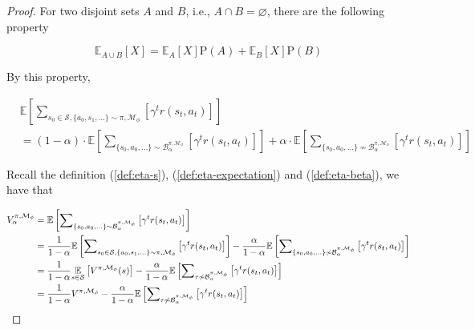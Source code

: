 \begin{proof}

For two disjoint sets $A$ and $B$, i.e., $A\cap B=\varnothing$, there are the following property

\begin{equation}
    \mathbb{E}_{A\cup B}[X] = \mathbb{E}_A[X]\mathrm{P}(A)+\mathbb{E}_B[X]\mathrm{P}(B)
\end{equation}

By this property,

\begin{align*}
    &\mathbb{E}\left[{\sum}_{s_0\in\mathcal{S},\{a_0,s_1,\ldots\} \sim\pi,\mathcal{M}_\phi}\left[\gamma^t r(s_t,a_t)\right]\right] \\
    &= (1-\alpha)\cdot \mathbb{E}\left[{\sum}_{\{s_0,a_0,\ldots\} \sim\mathcal{B}_\alpha^{\pi,\mathcal{M}_\phi}}\left[\gamma^t r(s_t,a_t)\right]\right] + \alpha\cdot\mathbb{E}\left[{\sum}_{\{s_0,a_0,\ldots\} \not\sim\mathcal{B}_\alpha^{\pi,\mathcal{M}_\phi}}\left[\gamma^t r(s_t,a_t)\right]\right]
\end{align*}

Recall the definition (\ref{def:eta-s}), (\ref{def:eta-expectation}) and (\ref{def:eta-beta}), we have that

\begin{align}
{V}^{\pi,\mathcal{M}_\phi}_\alpha&=\mathbb{E}\left[{\sum}_{\{s_0,a_0,\ldots\} \sim\mathcal{B}_\alpha^{\pi,\mathcal{M}_\phi}}\left[\gamma^t r(s_t,a_t)\right]\right]\notag\\
&=\frac{1}{1-\alpha}\mathbb{E}\left[{\sum}_{s_0\in\mathcal{S},\{a_0,s_1,\ldots\} \sim\pi,\mathcal{M}_\phi}\left[\gamma^t r(s_t,a_t)\right]\right]-\frac{\alpha}{1-\alpha}\mathbb{E}\left[{\sum}_{\{s_0,a_0,\ldots\} \not\sim\mathcal{B}_\alpha^{\pi,\mathcal{M}_\phi}}\left[\gamma^t r(s_t,a_t)\right]\right]\notag\\
&=\frac{1}{1-\alpha}\underset{s\in{\mathcal{S}}}{\mathbb{E}}\left[{V}^{\pi,\mathcal{M}_\phi}(s)\right]-\frac{\alpha}{1-\alpha}\mathbb{E}\left[{\sum}_{\tau \not\sim\mathcal{B}_\alpha^{\pi,\mathcal{M}_\phi}}\left[\gamma^t r(s_t,a_t)\right]\right]\notag\\
&=\frac{1}{1-\alpha}{V}^{\pi,\mathcal{M}_\phi}-\frac{\alpha}{1-\alpha}\mathbb{E}\left[{\sum}_{\tau \not\sim\mathcal{B}_\alpha^{\pi,\mathcal{M}_\phi}}\left[\gamma^t r(s_t,a_t)\right]\right]\label{proof:lem42p1}
\end{align}



\end{proof}

